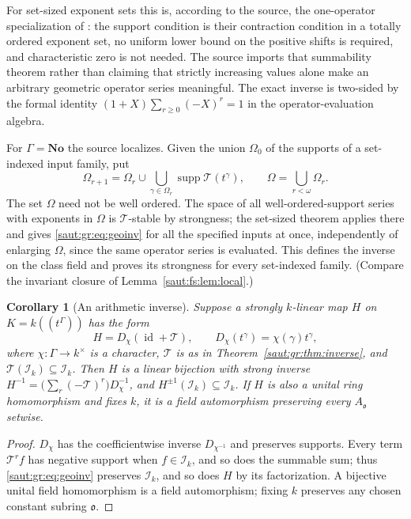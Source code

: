 \documentclass[11pt]{article}
\newtheorem{corollary}[theorem]{Corollary}
\theoremstyle{definition}
\theoremstyle{remark}
\newcommand{\No}{\mathbf{No}}
\newcommand{\id}{\operatorname{id}}
\newcommand{\supp}{\operatorname{supp}}
\newcommand{\Ineg}{\mathcal I}
\numberwithin{equation}{section}
\begin{document}
For set-sized exponent sets this is, according to the source, the one-operator
specialization of \cite[Theorem~3.11 and Proposition~1.45]{BKKS}: the support
condition is their contraction condition in a totally ordered exponent set, no
uniform lower bound on the positive shifts is required, and characteristic zero is
not needed. The source imports that summability theorem rather than claiming that
strictly increasing values alone make an arbitrary geometric operator series
meaningful. The exact inverse is two-sided by the formal identity
$(1+X)\sum_{r\ge0}(-X)^r=1$ in the operator-evaluation algebra.

For $\Gamma=\No$ the source localizes. Given the union $\Omega_0$ of the supports of a
set-indexed input family, put
\[
 \Omega_{r+1}=\Omega_r\cup\bigcup_{\gamma\in\Omega_r}\supp\mathcal T(t^\gamma),\qquad
 \Omega=\bigcup_{r<\omega}\Omega_r .
\]
The set $\Omega$ need not be well ordered. The space of all well-ordered-support
series with exponents in $\Omega$ is $\mathcal T$-stable by strongness; the set-sized
theorem applies there and gives \eqref{saut:gr:eq:geoinv} for all the specified inputs
at once, independently of enlarging $\Omega$, since the same operator series is
evaluated. This defines the inverse on the class field and proves its strongness for
every set-indexed family. (Compare the invariant closure of
Lemma~\ref{saut:fs:lem:local}.)

\begin{corollary}[An arithmetic inverse]\label{saut:gr:cor:arithinverse}
Suppose a strongly $k$-linear map $H$ on $K=k((t^\Gamma))$ has the form
\[
 H=D_\chi(\id+\mathcal T),\qquad D_\chi(t^\gamma)=\chi(\gamma)t^\gamma,
\]
where $\chi:\Gamma\to k^\times$ is a character, $\mathcal T$ is as in
Theorem~\ref{saut:gr:thm:inverse}, and $\mathcal T(\Ineg_k)\subseteq\Ineg_k$. Then $H$ is a
linear bijection with strong inverse $H^{-1}=\bigl(\sum_r(-\mathcal T)^r\bigr)D_\chi^{-1}$,
and $H^{\pm1}(\Ineg_k)\subseteq\Ineg_k$. If $H$ is also a unital ring homomorphism and
fixes $k$, it is a field automorphism preserving every $A_{\mathfrak o}$ setwise.
\end{corollary}
\begin{proof}
$D_\chi$ has the coefficientwise inverse $D_{\chi^{-1}}$ and preserves supports.
Every term $\mathcal T^rf$ has negative support when $f\in\Ineg_k$, and so does the
summable sum; thus \eqref{saut:gr:eq:geoinv} preserves $\Ineg_k$, and so does $H$ by its
factorization. A bijective unital field homomorphism is a field automorphism; fixing
$k$ preserves any chosen constant subring $\mathfrak o$.
\end{proof}
\end{document}

